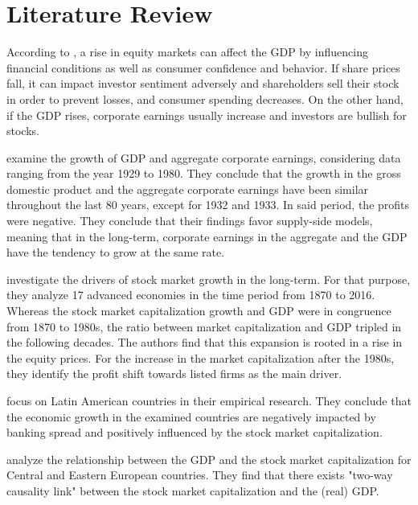 \documentclass[12pt,a4paper,english]{article}
\begin{document}
\section{Literature Review}

According to \cite{investo_stock_gdp}, a rise in equity markets can affect the GDP by influencing financial conditions as well as consumer confidence and behavior. If share prices fall, it can impact investor sentiment adversely and shareholders sell their stock in order to prevent losses, and consumer spending decreases. On the other hand, if the GDP rises, corporate earnings usually increase and investors are bullish for stocks. %

\cite{barra_is_2010} examine the growth of GDP and aggregate corporate earnings, considering data ranging from the year 1929 to 1980. They conclude that the growth in the gross domestic product and the aggregate corporate earnings have been similar throughout the last 80 years, except for 1932 and 1933. In said period, the profits were negative. They conclude that their findings favor supply-side models, meaning that in the long-term, corporate earnings in the aggregate and the GDP have the tendency to grow at the same rate. 

\cite{kuvshinov_big_2022} investigate the drivers of stock market growth in the long-term. For that purpose, they analyze 17 advanced economies in the time period from 1870 to 2016. Whereas the stock market capitalization growth and GDP were in congruence from 1870 to 1980s, the ratio between market capitalization and GDP tripled in the following decades. The authors find that this expansion is rooted in a rise in the equity prices. For the increase in the market capitalization after the 1980s, they identify the profit shift towards listed firms as the main driver. 

\cite{aali-bujari_impact_2017} focus on Latin American countries in their empirical research. They conclude that the economic growth in the examined countries are negatively impacted by banking spread and positively influenced by the stock market capitalization. 

\cite{prats_does_2020} analyze the relationship between the GDP and the stock market capitalization for Central and Eastern European countries. They find that there exists "two-way causality link" between the stock market capitalization and the (real) GDP. 
\end{document}
